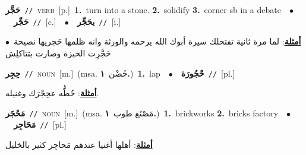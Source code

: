 \documentclass[10pt,a4paper,twoside]{article} %
\begin{document}
\begin{multicols}{2}
{\setlength\topsep{0pt}\textbf{\foreignlanguage{arabic}{حَجَّر}}\ {\color{gray}\texttt{//}\color{black}}\ \textsc{verb}\ [p.]\ \textbf{1.}~turn into a stone.  \textbf{2.}~solidify  \textbf{3.}~corner sb in a debate\ \ $\bullet$\ \ \setlength\topsep{0pt}\textbf{\foreignlanguage{arabic}{حَجِّر}}\ {\color{gray}\texttt{//}\color{black}}\ [c.]\ \ $\bullet$\ \ \setlength\topsep{0pt}\textbf{\foreignlanguage{arabic}{يحَجِّر}}\ {\color{gray}\texttt{//}\color{black}}\ [i.]\  \begin{flushright}\color{gray}\foreignlanguage{arabic}{\textbf{\underline{\foreignlanguage{arabic}{أمثلة}}}: لما مرة ثانية تفتحلك سيرة أبوك الله يرحمه والورثة وانه ظلمها حَجريها نصيحة\ $\bullet$\ \  حَجَّرِت الخبزة وصارت بتتاكلِش}\end{flushright}\color{black}} \vspace{2mm}

{\setlength\topsep{0pt}\textbf{\foreignlanguage{arabic}{حِجِر}}\ {\color{gray}\texttt{//}\color{black}}\ \textsc{noun}\ [m.]\ \color{gray}(msa. \foreignlanguage{arabic}{حُضْن}~\foreignlanguage{arabic}{\textbf{١.}})\color{black}\ \textbf{1.}~lap\ \ $\bullet$\ \ \setlength\topsep{0pt}\textbf{\foreignlanguage{arabic}{حْجُورَة}}\ {\color{gray}\texttt{//}\color{black}}\ [pl.]\  \begin{flushright}\color{gray}\foreignlanguage{arabic}{\textbf{\underline{\foreignlanguage{arabic}{أمثلة}}}: حُطُّه عحِجْرَك وغنيله.}\end{flushright}\color{black}} \vspace{2mm}

{\setlength\topsep{0pt}\textbf{\foreignlanguage{arabic}{مَحْجَر}}\ {\color{gray}\texttt{//}\color{black}}\ \textsc{noun}\ [m.]\ \color{gray}(msa. \foreignlanguage{arabic}{مَصْنَع طوب}~\foreignlanguage{arabic}{\textbf{١.}})\color{black}\ \textbf{1.}~brickworks  \textbf{2.}~bricks factory\ \ $\bullet$\ \ \setlength\topsep{0pt}\textbf{\foreignlanguage{arabic}{مَحَاجِر}}\ {\color{gray}\texttt{//}\color{black}}\ [pl.]\  \begin{flushright}\color{gray}\foreignlanguage{arabic}{\textbf{\underline{\foreignlanguage{arabic}{أمثلة}}}: أهلها أغنيا عندهم مَحاجِر كثير بالخليل}\end{flushright}\color{black}} \vspace{2mm}


\end{multicols}
\end{document}
